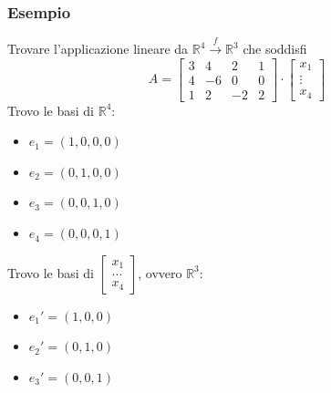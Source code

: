 \documentclass[italian]{article}
\newcommand{\ins}[1]{\text{$\mathbb{#1}$}}
\begin{document}
\subsubsection{Esempio}
Trovare l'applicazione lineare da $\ins{R}^4 \xrightarrow{f} \ins{R}^3$ che soddisfi
\[
	A = 
	\begin{bmatrix}
		3 & 4 & 2 & 1 \\
		4 & -6 & 0 & 0 \\
		1 & 2 & -2 & 2
	\end{bmatrix}
	\cdot
	\begin{bmatrix}
		x_1 \\ \vdots \\ x_4
	\end{bmatrix}
\]
Trovo le basi di $\ins{R}^4$:
\begin{itemize}
	\item $e_1 = (1,0,0,0)$
	\item $e_2 = (0,1,0,0)$
	\item $e_3 = (0,0,1,0)$
	\item $e_4 = (0,0,0,1)$
\end{itemize}
Trovo le basi di $ \begin{bmatrix} x_1 \\ ... \\ x_4 \end{bmatrix}$, ovvero $\ins{R}^3$:
\begin{itemize}
	\item $e_1' = (1,0,0)$
	\item $e_2' = (0,1,0)$
	\item $e_3' = (0,0,1)$
\end{itemize}
\end{document}
